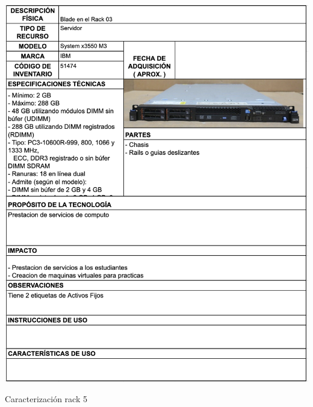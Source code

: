 \begin{table}[H]
    \centering
    \includegraphics[width=\textwidth]{tablas-images/cp1/racks/rack-5.png}
    \caption{Caracterización rack 5}\label{tab:rack-5}
\end{table}

